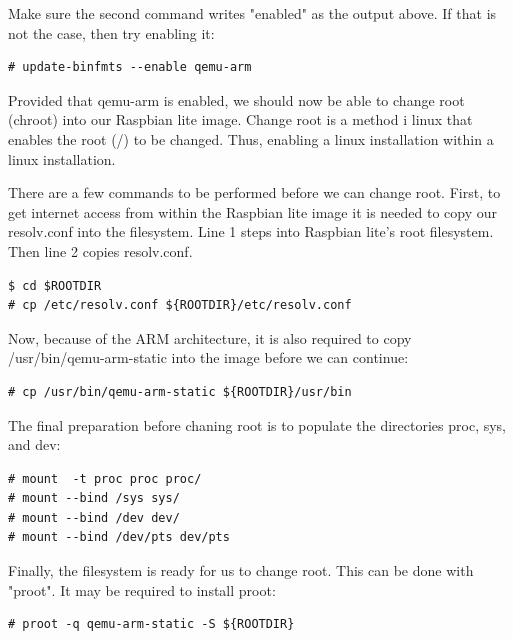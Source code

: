 Make sure the second command writes "enabled" as the output above. If that 
is not the case, then try enabling it:

\begin{lstlisting}[]
# update-binfmts --enable qemu-arm
\end{lstlisting}
\FloatBarrier
\vspace{-5mm}

Provided that qemu-arm is enabled, we should now be able to change root (chroot)
into our Raspbian lite image. Change root is a method i linux that enables
the root (/) to be changed. Thus, enabling a linux installation within a
linux installation.

There are a few commands to be performed before we can change root.
First, to get internet access from within the Raspbian lite image it is needed
to copy our resolv.conf into the filesystem. Line 1 steps into Raspbian lite's
root filesystem. Then line 2 copies resolv.conf.

\begin{lstlisting}[]
$ cd $ROOTDIR
# cp /etc/resolv.conf ${ROOTDIR}/etc/resolv.conf
\end{lstlisting}
\FloatBarrier
\vspace{-5mm}

Now, because of the ARM architecture, it is also required to copy
/usr/bin/qemu-arm-static into the image before we can continue:

\begin{lstlisting}[]
# cp /usr/bin/qemu-arm-static ${ROOTDIR}/usr/bin
\end{lstlisting}
\FloatBarrier
\vspace{-5mm}

The final preparation before chaning root is to populate the directories proc,
sys, and dev:

\begin{lstlisting}[]
# mount  -t proc proc proc/
# mount --bind /sys sys/
# mount --bind /dev dev/
# mount --bind /dev/pts dev/pts
\end{lstlisting}
\FloatBarrier
\vspace{-5mm}

Finally, the filesystem is ready for us to change root. This can be done with
"proot". It may be required to install proot:

\begin{lstlisting}[]
# proot -q qemu-arm-static -S ${ROOTDIR}
\end{lstlisting}
\FloatBarrier
\vspace{-5mm}

